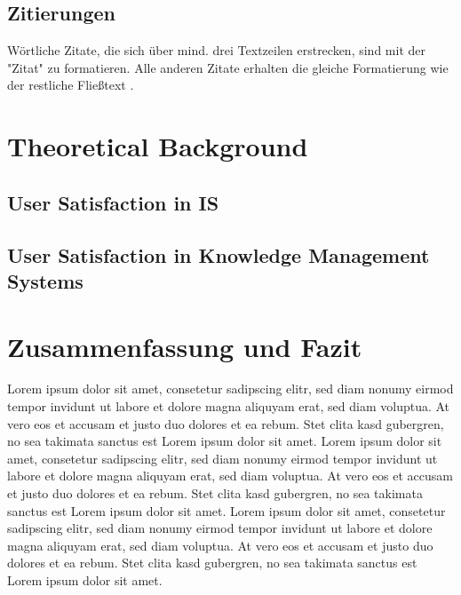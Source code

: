 \documentclass[
	ngerman,
	ruledheaders=section,%
	class=report,%
	thesis={type=bachelor},%
	accentcolor=1b,%
	custommargins=true,%
	marginpar=false,%
	parskip=half-,%
	fontsize=11pt,%
	DIV=14,
]{tudapub}
\begin{document}
\section{Zitierungen}
Wörtliche Zitate, die sich über mind. drei Textzeilen erstrecken, sind mit der "Zitat" zu formatieren. Alle anderen Zitate erhalten die gleiche Formatierung wie der restliche Fließtext \parencite{buxmann2015softwareindustrie}.

\chapter{Theoretical Background}
\section{User Satisfaction in IS}
\section{User Satisfaction in Knowledge Management Systems}




\chapter{Zusammenfassung und Fazit}
Lorem ipsum dolor sit amet, consetetur sadipscing elitr, sed diam nonumy eirmod tempor invidunt ut labore et dolore magna aliquyam erat, sed diam voluptua. At vero eos et accusam et justo duo dolores et ea rebum. Stet clita kasd gubergren, no sea takimata sanctus est Lorem ipsum dolor sit amet. Lorem ipsum dolor sit amet, consetetur sadipscing elitr, sed diam nonumy eirmod tempor invidunt ut labore et dolore magna aliquyam erat, sed diam voluptua. At vero eos et accusam et justo duo dolores et ea rebum. Stet clita kasd gubergren, no sea takimata sanctus est Lorem ipsum dolor sit amet. Lorem ipsum dolor sit amet, consetetur sadipscing elitr, sed diam nonumy eirmod tempor invidunt ut labore et dolore magna aliquyam erat, sed diam voluptua. At vero eos et accusam et justo duo dolores et ea rebum. Stet clita kasd gubergren, no sea takimata sanctus est Lorem ipsum dolor sit amet.
\end{document}

